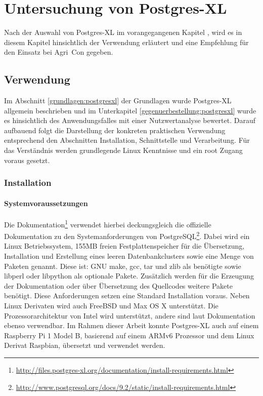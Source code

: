 \chapter{Untersuchung von Postgres-XL}
\label{chapter:postgresxl}

Nach der Auswahl von Postgres-XL im vorangegangenen Kapitel%
, wird es in diesem Kapitel hinsichtlich der Verwendung erläutert und eine Empfehlung für den Einsatz bei Agri~Con gegeben.

\section{Verwendung}

Im Abschnitt \ref{grundlagen:postgresxl} der Grundlagen wurde Postgres-XL allgemein beschrieben und im Unterkapitel \ref{gegenuerbestellung:postgresxl} wurde es hinsichtlich des Anwendungsfalles mit einer Nutzwertanalyse bewertet.
Darauf aufbauend folgt die Darstellung der konkreten praktischen Verwendung entsprechend den Abschnitten Installation, Schnittstelle und Verarbeitung.
Für das Verständnis werden grundlegende Linux Kenntnisse und ein root Zugang voraus gesetzt.

\subsection{Installation}

\subsubsection{Systemvoraussetzungen}
Die Dokumentation\footnote{\url{http://files.postgres-xl.org/documentation/install-requirements.html}} verwendet hierbei deckungsgleich die offizielle Dokumentation zu den Systemanforderungen von PostgreSQL\footnote{\url{http://www.postgresql.org/docs/9.2/static/install-requirements.html}}.
Dabei wird ein Linux Betriebssystem, 155MB freien Festplattenspeicher für die Übersetzung, Installation und Erstellung eines leeren Datenbankclusters sowie eine Menge von Paketen genannt.
Diese ist: GNU make, gcc, tar und zlib als benötigte sowie libperl oder libpython als optionale Pakete.
Zusätzlich werden für die Erzeugung der Dokumentation oder über Übersetzung des Quellcodes weitere Pakete benötigt.
Diese Anforderungen setzen eine Standard Installation voraus.
Neben Linux Derivaten wird auch FreeBSD und Max OS X unterstützt.
Die Prozessorarchitektur von Intel wird unterstützt, andere sind laut Dokumentation ebenso verwendbar.
Im Rahmen dieser Arbeit konnte Postgres-XL auch auf einem Raspberry Pi 1 Model B, basierend auf einem ARMv6 Prozessor und dem Linux Derivat Raspbian, übersetzt und verwendet werden.

